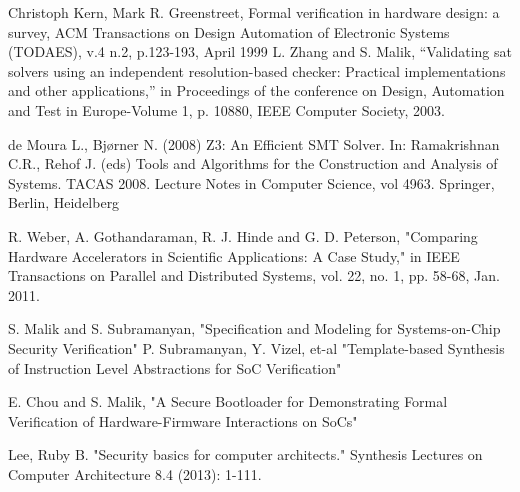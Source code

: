 \documentclass[../report.tex]{subfiles}
\begin{document}
\pagebreak
\begingroup
\renewcommand{\section}[2]{}

\begin{singlespace}
\begin{flushleft}

\begin{footnotesize}

\begin{thebibliography}{\kern\bibindent}

        Christoph Kern, Mark R. Greenstreet, Formal verification in hardware design: a survey, ACM Transactions on Design Automation of Electronic Systems (TODAES), v.4 n.2, p.123-193, April 1999 
        L. Zhang and S. Malik, “Validating sat solvers using an independent resolution-based checker: Practical implementations and other applications,” in Proceedings of the conference on Design, Automation and Test in Europe-Volume 1, p. 10880, IEEE Computer Society, 2003.

        de Moura L., Bjørner N. (2008) Z3: An Efficient SMT Solver. In: Ramakrishnan C.R., Rehof J. (eds) Tools and Algorithms for the Construction and Analysis of Systems. TACAS 2008. Lecture Notes in Computer Science, vol 4963. Springer, Berlin, Heidelberg

        R. Weber, A. Gothandaraman, R. J. Hinde and G. D. Peterson, "Comparing Hardware Accelerators in Scientific Applications: A Case Study," in IEEE Transactions on Parallel and Distributed Systems, vol. 22, no. 1, pp. 58-68, Jan. 2011.

        S. Malik and S. Subramanyan, "Specification and Modeling for Systems-on-Chip Security Verification"
        P. Subramanyan,  Y. Vizel, et-al "Template-based Synthesis of
        Instruction Level Abstractions for SoC Verification"

E. Chou and S. Malik, "A Secure Bootloader for Demonstrating Formal Verification of Hardware-Firmware Interactions on SoCs"

        Lee, Ruby B. "Security basics for computer architects." Synthesis Lectures on Computer Architecture 8.4 (2013): 1-111.


\end{thebibliography}
\end{footnotesize}
\end{flushleft}
\end{singlespace}
\end{document}
